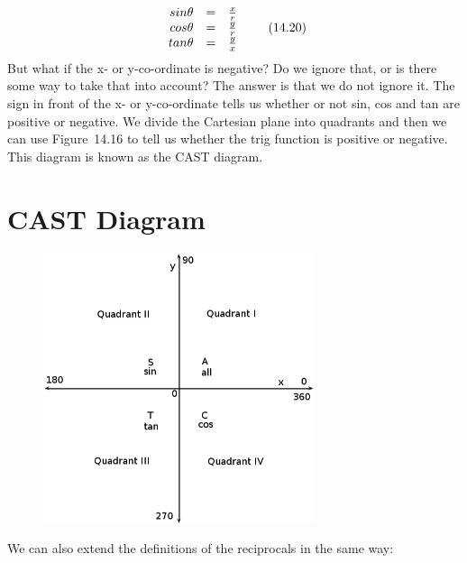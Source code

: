 \par \label{m39411*eip-169}\nopagebreak\noindent{}
    \begin{equation}
    \begin{array}{ccc}\hfill sin\theta & =& \frac{x}{r}\hfill \\ \hfill cos\theta & =& \frac{y}{r}\hfill \\ \hfill tan\theta & =& \frac{y}{x}\hfill \end{array}\tag{14.20}
      \end{equation}
    \label{m39411*eip-102}But what if the x- or y-co-ordinate is negative? Do we ignore that, or is there some way to take that into account? The answer is that we do not ignore it. The sign in front of the x- or y-co-ordinate tells us whether or not sin, cos and tan are positive or negative. We divide the Cartesian plane into quadrants and then we can use Figure~14.16 to tell us whether the trig function is positive or negative. This diagram is known as the CAST diagram.\par \label{m39411*eip-216}
    \setcounter{subfigure}{0}
\section{CAST Diagram}
\begin{figure}[H] %
    \begin{center}
    \label{m39411*id63358!!!underscore!!!media}\label{m39411*id63358!!!underscore!!!printimage}\includegraphics[width=300px]{col11306.imgs/m39411_CAST.png} %
      \vspace{2pt}
    \vspace{.1in}
    \end{center}
 \end{figure}       \par \label{m39411*eip-927}We can also extend the definitions of the reciprocals in the same way:
\label{m39411*id89342}\nopagebreak\noindent{}

